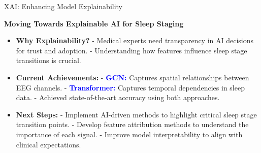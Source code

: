 
\begin{frame}{XAI: Enhancing Model Explainability}

    \textbf{Moving Towards Explainable AI for Sleep Staging}
    \vspace{0.5cm}
    
    \begin{itemize}
        \item \textbf{Why Explainability?}  
              - Medical experts need transparency in AI decisions for trust and adoption.  
              - Understanding how features influence sleep stage transitions is crucial.
              
        \item \textbf{Current Achievements:}  
              - \textcolor{blue}{\textbf{GCN:}} Captures spatial relationships between EEG channels.  
              - \textcolor{blue}{\textbf{Transformer:}} Captures temporal dependencies in sleep data.  
              - Achieved state-of-the-art accuracy using both approaches.
              
        \item \textbf{Next Steps:}  
              - Implement AI-driven methods to highlight critical sleep stage transition points.  
              - Develop feature attribution methods to understand the importance of each signal.  
              - Improve model interpretability to align with clinical expectations.
    \end{itemize}

\end{frame}


